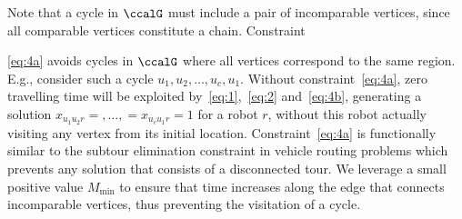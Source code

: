 \documentclass[Afour,sageh,times]{sagej}
\begin{document}
  {Note that a cycle in $\ccalG$ must include a pair of incomparable vertices, since all comparable vertices constitute a chain.} Constraint~{\eqref{eq:4a} avoids cycles in $\ccalG$ where all vertices correspond to the same region. E.g., consider such a cycle $u_1,u_2,\ldots, u_c, u_1$. Without  constraint~\eqref{eq:4a}, zero travelling time will be exploited by~\eqref{eq:1},~\eqref{eq:2} and~\eqref{eq:4b}, generating a solution $x_{u_1 u_2 r} = ,\ldots,=x_{u_c u_{1} r}= 1$ for a robot $r$, without this robot actually visiting any vertex from its initial location.  Constraint~\eqref{eq:4a} is functionally similar to the subtour elimination constraint in vehicle routing problems which prevents any solution that consists of a disconnected tour. We leverage a small positive value $M_{\text{min}}$ to ensure that time increases along the edge that connects incomparable vertices, thus preventing the visitation of a cycle.

}
\end{document}
